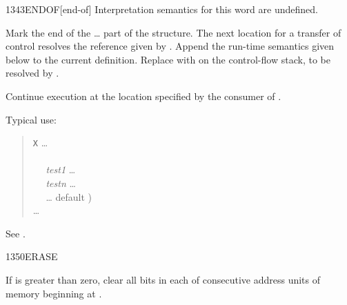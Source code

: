 \vspace*{-1.5ex}
\begin{worddef}{1343}{ENDOF}[end-of]
\interpret
	Interpretation semantics for this word are undefined.

\compile

	Mark the end of the \ldots{} part of the
	 structure. The next location for a transfer of
	control resolves the reference given by . Append
	the run-time semantics given below to the current definition.
	Replace  with  on the
	control-flow stack, to be resolved by .

\runtime
	\stack{}{}

	Continue execution at the location specified by the consumer
	of .


	\begin{rationale} %
		Typical use:
		\begin{quote}
			\word{:} \texttt{X} {\ldots} \\
			\tab {} \\
			\tab~~ \emph{test1}  {\ldots}  \\
			\tab~~ \emph{testn}  {\ldots}  \\
			\tab~~ {\ldots}  default ) \\
			\tab {} {\ldots} \\
			\word{;}
		\end{quote}
	\end{rationale}

	\begin{testing}
		See .
	\end{testing}
\end{worddef}

\vspace*{-1.5ex}
\begin{worddef}{1350}{ERASE}
\item {}

	If  is greater than zero, clear all bits in each of
	 consecutive address units of memory beginning at
	.
\end{worddef}


